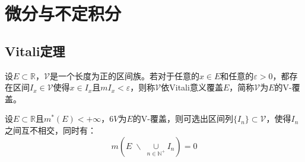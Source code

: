 \section{微分与不定积分}

\subsection{Vitali定理}
\begin{definition}
	设$E\subset\mathbb{R}$，$\mathcal{V}$是一个长度为正的区间族。若对于任意的$x\in E$和任意的$\varepsilon>0$，都存在区间$I_x\in\mathcal{V}$使得$x\in I_x$且$mI_x<\varepsilon$，则称$\mathcal{V}$依Vitali意义覆盖$E$，简称$\mathcal{V}$为$E$的V-覆盖。
\end{definition}
\begin{theorem}
	设$E\subset\mathbb{R}$且$m^*(E)<+\infty$，$\mathcal6{V}$为$E$的V-覆盖，则可选出区间列$\{I_n\}\subset\mathcal{V}$，使得$I_n$之间互不相交，同时有：
	\begin{equation*}
		m\left(E\;\backslash\;\underset{n\in\mathbb{N}^+}{\cup}I_n\right)=0
	\end{equation*}
\end{theorem}

